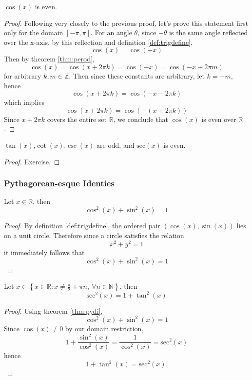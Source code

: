 \documentclass[11pt]{article}
\numberwithin{lemma}{section}
\numberwithin{equation}{section}
\numberwithin{define}{section}
\numberwithin{prop}{section}
\numberwithin{figure}{section}
\numberwithin{theorem}{section}
\numberwithin{cor}{section}
\newcounter{ex}[section]
\numberwithin{ex}{section}
\def\real{\mathbb{R}}
\def\nat{\mathbb{N}}
\def\integ{\mathbb{Z}}
\def\cbrak#1{\left\{#1\right\}}
\begin{document}
\begin{theorem}
	$\cos(x)$ is even.
	\label{thm:coseven}
\end{theorem}
\begin{proof}
	Following very closely to the previous proof, let's prove this statement first only for the domain $[-\pi,\pi]$.
	For an angle $\theta$, since $-\theta$ is the same angle reflected over the x-axis, by this reflection and definition \eqref{def:trigdefine},
	$$\cos(x)=\cos(-x)$$
	Then by theorem \eqref{thm:perod},
	$$\cos(x)=\cos(x+2\pi k)=\cos(-x)=\cos(-x+2\pi m)$$
	for arbitrary $k,m\in\integ$. Then since these constants are arbitrary, let $k=-m$, hence
	$$\cos(x+2\pi k)=\cos(-x-2\pi k)$$
	which implies
	$$\cos(x+2\pi k)=\cos(-(x+2\pi k))$$
	Since $x+2\pi k$ covers the entire set $\real$, we conclude that $\cos(x)$ is even over $\real$.
\end{proof}

\begin{cor}
	$\tan(x)$,$\cot(x)$,$\csc(x)$ are odd, and $\text{sec}(x)$ is even.	
\end{cor}
\begin{proof}
	Exercise.
\end{proof}



\subsubsection{Pythagorean-esque Identies}
\begin{theorem}
\label{thm:pydi}
Let $x\in\real$, then
$$\cos^2(x)+\sin^2(x)=1$$	
\end{theorem}
\begin{proof}
	By definition \eqref{def:trigdefine}, the ordered pair $(\cos(x),\sin(x))$ lies on a unit circle. Therefore since a circle satisfies the relation
	$$x^2+y^2=1$$
	it immediately follows that
	$$\cos^2(x)+\sin^2(x)=1$$
\end{proof}
\begin{cor}
Let $x\in \cbrak{x\in\real: x\neq \frac{\pi}{2}+\pi n, \: 
\forall n\in\nat}$, then
$$\text{sec}^2(x)=1+\tan^2(x)$$	
\end{cor}
\begin{proof}
	Using theorem \eqref{thm:pydi},
	$$\cos^2(x)+\sin^2(x)=1$$
	Since $\cos(x)\neq0$ by our domain restriction,
	$$1+\frac{\sin^2(x)}{\cos^2(x)}=\frac{1}{\cos^2(x)}=\text{sec}^2(x)$$
	hence
	$$1+\tan^2(x)=\text{sec}^2(x).$$
\end{proof}
\end{document}
